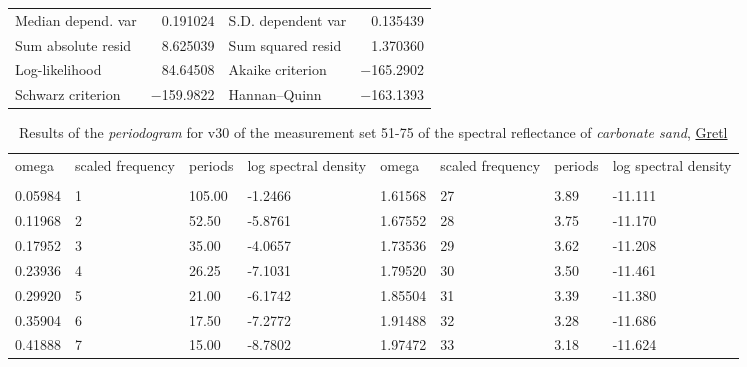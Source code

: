 \documentclass[11pt]{article}
\begin{document}
\begin{appendices}
\begin{table}[H]
\begin{center}
\vspace{1ex}
	\begin{tabular}{lrlr}
		Median depend. var &  0.191024 & S.D. dependent var &  0.135439 \\
		Sum absolute resid &  8.625039 & Sum squared resid &  1.370360 \\
		Log-likelihood &  84.64508 & Akaike criterion & $-$165.2902 \\
		Schwarz criterion & $-$159.9822 & Hannan--Quinn & $-$163.1393 \\ \hline \hline
	\end{tabular}
	\end{center}
\label{tab:29}
\end{table}
\pagebreak

\begin{table}[H]
	\begin{small}
	\caption{Results of the \textit{periodogram} for v30 of the measurement set 51-75 of the spectral reflectance of \textit{carbonate sand}, \href{http://gretl.sourceforge.net/}{Gretl}}
	\label{tab:30}
	\begin{center}
	\begin{tabular}{|p{15mm} p{15mm} p{15mm} p{15mm} || p{15mm} p{15mm}p{15mm} p{15mm}|}
		omega & scaled frequency & periods & log spectral density & omega & scaled frequency & periods & log spectral density \\ \\ \hline\hline
		0.05984      & 1    &      105.00  &      -1.2466  &  1.61568   &   27    &        3.89     &    -11.111\\ 
		 0.11968     &  2   &        52.50   &      -5.8761 &   1.67552   &   28    &        3.75     &    -11.170\\ 
		 0.17952     &  3   &        35.00   &      -4.0657 &  1.73536   &   29    &        3.62     &    -11.208\\ 
		 0.23936     &  4   &        26.25   &      -7.1031 &  1.79520   &   30    &        3.50     &    -11.461\\ 
		 0.29920     &  5   &        21.00   &      -6.1742 &  1.85504   &   31    &        3.39     &    -11.380\\ 
		 0.35904     &  6   &        17.50   &      -7.2772  & 1.91488    & 32     &       3.28      &   -11.686\\ 
		 0.41888     &  7     &      15.00   &      -8.7802 &  1.97472    &  33    &        3.18     &    -11.624\\ 

\end{tabular}
\end{center}
\end{small}
\end{table}
\end{appendices}
\end{document}
